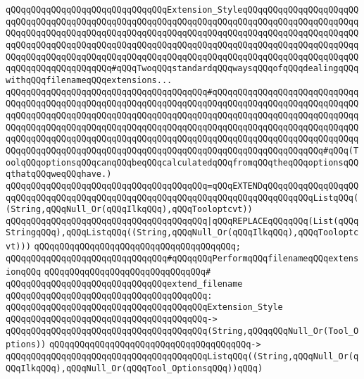 \newline
\verb|qQQqqQQqqQQqqQQqqQQqqQQqqQQqqQQqExtension_StyleqQQqqQQqqQQqqQQqqQQqqQQqqQQqqQQqqQQqqQQqqQQqqQQqqQQqqQQqqQQqqQQqqQQqqQQqqQQqqQQqqQQqqQQqqQQqqQQqqQQqqQQqqQQqqQQqqQQqqQQqqQQqqQQqqQQqqQQqqQQqqQQqqQQqqQQqqQQqqQQqqQQqqQQqqQQqqQQqqQQqqQQqqQQqqQQqqQQqqQQqqQQqqQQqqQQqqQQqqQQqqQQqqQQqqQQqqQQqqQQqqQQqqQQqqQQqqQQqqQQqqQQqqQQqqQQqqQQqqQQqqQQqqQQqqQQqqQQqqQQqqQQqqQQqqQQqqQQqqQQqqQQq#qQQqTwoqQQqstandardqQQqwaysqQQqofqQQqdealingqQQqwithqQQqfilenameqQQqextensions...|\newline
\verb|qQQqqQQqqQQqqQQqqQQqqQQqqQQqqQQqqQQqqQQq#qQQqqQQqqQQqqQQqqQQqqQQqqQQqqQQqqQQqqQQqqQQqqQQqqQQqqQQqqQQqqQQqqQQqqQQqqQQqqQQqqQQqqQQqqQQqqQQqqQQqqQQqqQQqqQQqqQQqqQQqqQQqqQQqqQQqqQQqqQQqqQQqqQQqqQQqqQQqqQQqqQQqqQQqqQQqqQQqqQQqqQQqqQQqqQQqqQQqqQQqqQQqqQQqqQQqqQQqqQQqqQQqqQQqqQQqqQQqqQQqqQQqqQQqqQQqqQQqqQQqqQQqqQQqqQQqqQQqqQQqqQQqqQQqqQQqqQQqqQQqqQQqqQQqqQQqqQQqqQQqqQQqqQQqqQQqqQQqqQQqqQQqqQQqqQQqqQQqqQQqqQQqqQQqqQQq#qQQq(ToolqQQqoptionsqQQqcanqQQqbeqQQqcalculatedqQQqfromqQQqtheqQQqoptionsqQQqthatqQQqweqQQqhave.)|\newline
\verb|qQQqqQQqqQQqqQQqqQQqqQQqqQQqqQQqqQQqqQQq=qQQqEXTENDqQQqqQQqqQQqqQQqqQQqqQQqqQQqqQQqqQQqqQQqqQQqqQQqqQQqqQQqqQQqqQQqqQQqqQQqqQQqqQQqListqQQq((String,qQQqNull_Or(qQQqIlkqQQq),qQQqTooloptcvt))|\newline
\verb|qQQqqQQqqQQqqQQqqQQqqQQqqQQqqQQqqQQqqQQq|\verb#|qQQqREPLACEqQQqqQQq(List(qQQqStringqQQq),qQQqListqQQq((String,qQQqNull_Or(qQQqIlkqQQq),qQQqTooloptcvt)))#\newline
\verb|qQQqqQQqqQQqqQQqqQQqqQQqqQQqqQQqqQQqqQQq;|\newline
\newline
\verb|qQQqqQQqqQQqqQQqqQQqqQQqqQQqqQQq#qQQqqQQqPerformqQQqfilenameqQQqextensionqQQq|\newline
\verb|qQQqqQQqqQQqqQQqqQQqqQQqqQQqqQQq#|\newline
\verb|qQQqqQQqqQQqqQQqqQQqqQQqqQQqqQQqextend_filename|\newline
\verb|qQQqqQQqqQQqqQQqqQQqqQQqqQQqqQQqqQQqqQQq:|\newline
\verb|qQQqqQQqqQQqqQQqqQQqqQQqqQQqqQQqqQQqqQQqExtension_Style|\newline
\verb|qQQqqQQqqQQqqQQqqQQqqQQqqQQqqQQqqQQqqQQq->|\newline
\verb|qQQqqQQqqQQqqQQqqQQqqQQqqQQqqQQqqQQqqQQq(String,qQQqqQQqNull_Or(Tool_Options))|\newline
\verb|qQQqqQQqqQQqqQQqqQQqqQQqqQQqqQQqqQQqqQQq->|\newline
\verb|qQQqqQQqqQQqqQQqqQQqqQQqqQQqqQQqqQQqqQQqListqQQq((String,qQQqNull_Or(qQQqIlkqQQq),qQQqNull_Or(qQQqTool_OptionsqQQq))qQQq)|\newline
